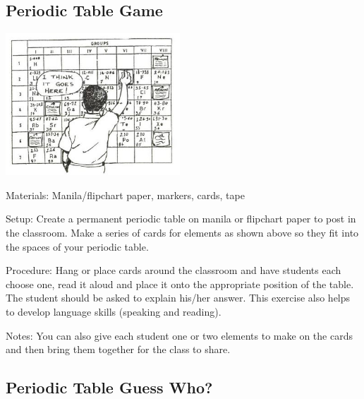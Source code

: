 \begin{multicols}{2}
\vfill
\columnbreak

\subsection{Periodic Table Game}

\begin{center}
\includegraphics[width=0.49\textwidth]{./img/source/periodic-table-game.jpg}
\end{center}

\begin{description*}
\item[Materials:]{Manila/flipchart paper, markers, cards, tape}
\item[Setup:]{Create a permanent periodic table on manila or flipchart paper to post in the classroom. Make a series of cards for elements as
shown above so they fit into the spaces of your
periodic table. }
\item[Procedure:]{Hang or place cards around the classroom and have students each choose one, read it aloud and place it onto the
appropriate position of the table. The
student should be asked to explain his/her
answer. This exercise also helps to develop
language skills (speaking and reading).}
\item[Notes:]{You can also give each student one or two elements to make on the cards and then bring them together for the class to share.}
\end{description*}

\vfill
\columnbreak

\subsection{Periodic Table Guess Who?}


\end{multicols}
